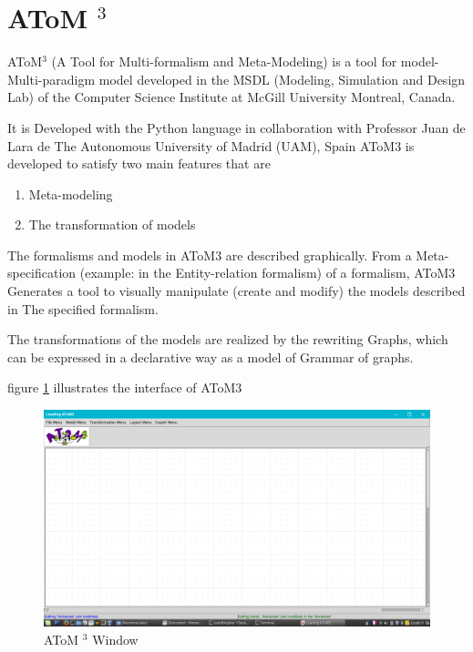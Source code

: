 \pagebreak

\section{AToM $^{3}$}

AToM$^{3}$ (A Tool for Multi-formalism and Meta-Modeling) is a tool for model-
Multi-paradigm model developed in the MSDL (Modeling, Simulation and
Design Lab) of the Computer Science Institute at McGill University Montreal, Canada\cite{Siteatom, ch3-atom3}.

It is Developed with the Python language in collaboration with Professor Juan de Lara de
The Autonomous University of Madrid (UAM), Spain  
AToM3 is developed to satisfy two main features that are 
\begin{enumerate}
	\item Meta-modeling 
\item The transformation of models
\end{enumerate}

The formalisms and models in AToM3 are described graphically. 
From a Meta-specification (example: in the Entity-relation formalism) of a formalism, AToM3
Generates a tool to visually manipulate (create and modify) the models described in
The specified formalism.

 The transformations of the models are realized by the rewriting
Graphs, which can be expressed in a declarative way as a model of
Grammar of graphs\cite{ch3-meta2}.

 figure \ref{fig:AToM3 Window} illustrates the interface of AToM3 

\begin{figure}[th]
	\centering
		\includegraphics[scale=0.33]{ch3/img/atom3}
	\caption{\label{fig:AToM3 Window}AToM $^{3}$ Window}
\end{figure} 
\pagebreak
